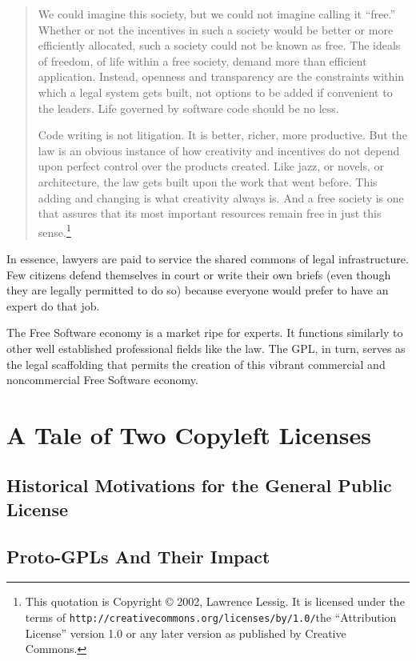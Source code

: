 \begin{quotation}
We could imagine this society, but we could not imagine calling it
``free.''  Whether or not the incentives in such a society would be better
or more efficiently allocated, such a society could not be known as free.
The ideals of freedom, of life within a free society, demand more than
efficient application. Instead, openness and transparency are the
constraints within which a legal system gets built, not options to be
added if convenient to the leaders. Life governed by software code should
be no less.

Code writing is not litigation. It is better, richer, more
productive. But the law is an obvious instance of how creativity and
incentives do not depend upon perfect control over the products
created. Like jazz, or novels, or architecture, the law gets built
upon the work that went before. This adding and changing is what
creativity always is. And a free society is one that assures that its
most important resources remain free in just this sense.\footnote{This
quotation is Copyright \copyright{} 2002, Lawrence Lessig. It is
licensed under the terms of
\texttt{http://creativecommons.org/licenses/by/1.0/}{the ``Attribution
License'' version 1.0} or any later version as published by Creative
Commons.}
\end{quotation}

In essence, lawyers are paid to service the shared commons of legal
infrastructure. Few citizens defend themselves in court or write their
own briefs (even though they are legally permitted to do so) because
everyone would prefer to have an expert do that job.

The Free Software economy is a market ripe for experts. It
functions similarly to other well established professional fields like the
law. The GPL, in turn, serves as the legal scaffolding that permits the
creation of this vibrant commercial and noncommercial Free Software
economy.

\chapter{A Tale of Two Copyleft Licenses}

\section{Historical Motivations for the General Public License}

\section{Proto-GPLs And Their Impact}


